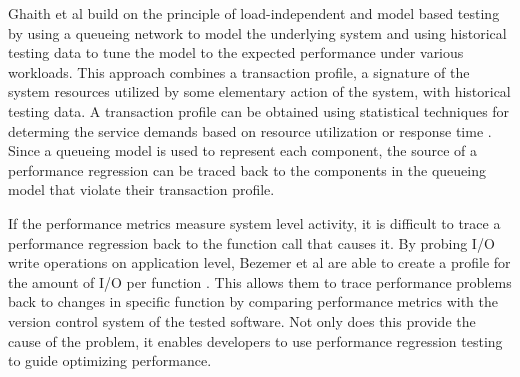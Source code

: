 Ghaith et al build on the principle of load-independent and model based testing by using a queueing network to model the underlying system and using historical testing data to tune the model to the expected performance under various workloads. \cite{ghaith2013profile} This approach combines a transaction profile, a signature of the system resources utilized by some elementary action of the system, with historical testing data. A transaction profile can be obtained using statistical techniques for determing the service demands based on resource utilization \cite{casale2008robust} or response time \cite{kraft2009estimating}. Since a queueing model is used to represent each component, the source of a performance regression can be traced back to the components in the queueing model that violate their transaction profile.

If the performance metrics measure system level activity, it is difficult to trace a performance regression back to the function call that causes it. By probing I/O write operations on application level, Bezemer et al are able to create a profile for the amount of I/O per function \cite{bezemer2014detecting}. This allows them to trace performance problems back to changes in specific function by comparing performance metrics with the version control system of the tested software. Not only does this provide the cause of the problem, it enables developers to use performance regression testing to guide optimizing performance.

